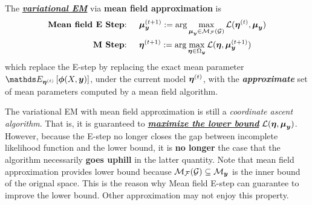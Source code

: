 \documentclass[11pt]{article}
\begin{document}
The \underline{\textbf{\emph{variational EM}}} via \textbf{mean field approximation} is 
\begin{align}
\text{\textbf{Mean field E Step}: }\quad  &\boldsymbol{\mu}_{\boldsymbol{y}}^{(t+1)} := \arg\max_{\boldsymbol{\mu}_{\boldsymbol{y}} \in {\mathcal M}_{{\mathcal F}}({\mathcal G}) }  {\mathcal L}(\boldsymbol{\eta}^{(t)}, \boldsymbol{\mu}_{\boldsymbol{y}})   \label{eqn: em_val_e_step_mean_field}\\
\text{\textbf{M Step}: }\quad &\boldsymbol{\eta}^{(t+1)} := \arg\max_{\boldsymbol{\eta} \in \Omega_{\boldsymbol{y}}}  {\mathcal L}(\boldsymbol{\eta}, \boldsymbol{\mu}_{\boldsymbol{y}}^{(t+1)} )  \nonumber
\end{align} which replace the E-step by replacing the exact mean parameter $\E{\mb{\eta}^{(t)}}{\mb{\phi}(X, \mb{y})}$, under the current model $\boldsymbol{\eta}^{(t)}$, with the \emph{\textbf{approximate}} set of mean parameters computed by a mean field algorithm.

The variational EM with mean field approximation is still a \emph{coordinate ascent algorithm}. That is, it is guaranteed to \underline{\textbf{\emph{maximize the lower bound}}} ${\mathcal L}(\boldsymbol{\eta}, \boldsymbol{\mu}_{\boldsymbol{y}})$.  However, because the E-step no longer closes the gap between incomplete likelihood function and the lower bound, it is \textbf{no longer} the case that the algorithm necessarily \textbf{goes uphill} in the latter quantity.  Note that mean field approximation  provides lower bound because ${\mathcal M}_{{\mathcal F}}({\mathcal G}) \subseteq {\mathcal M}_{\boldsymbol{y}}$ is the inner bound of the orignal space. This is the reason why Mean field E-step can guarantee to improve the lower bound. Other approximation may not enjoy this property.
\end{document}
